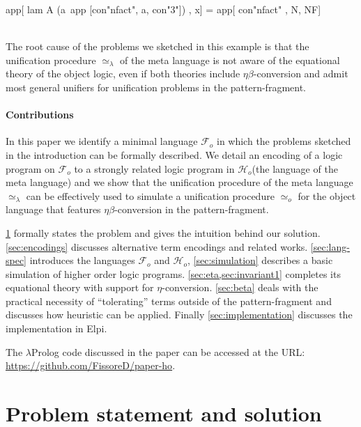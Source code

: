 \documentclass[sigconf,natbib=false,review]{acmart}
\newcommand{\UnifRel}{\ensuremath{\simeq}}
\newcommand{\Uo}{\ensuremath{\UnifRel_o}\xspace}
\newcommand{\Ue}{\ensuremath{\UnifRel_\lambda}\xspace}
\newcommand{\llambda}{\ensuremath{\mathcal{L}_\lambda}\xspace}
\newcommand{\Fo}{\ensuremath{\mathcal{F}_{\!o}\xspace}} %
\newcommand{\Ho}{\ensuremath{\mathcal{H}_o}\xspace}
\begin{document}
\begin{elpicode}
app[ lam A (a\ app [con"nfact", a, con"3"]) , x] =
app[ con"nfact"                             , N, NF]
\end{elpicode}
\noindent
~\\
The root cause of the problems we sketched in this example
is that the unification procedure \Ue of the meta language is not aware
of the equational theory of the object logic, even if both theories
include $\eta\beta$-conversion and admit most general
unifiers for unification problems in the pattern-fragment.

\paragraph{Contributions}
In this paper we identify a minimal language \Fo{} in which the problems
sketched in the introduction can be formally described.
We detail an encoding of a logic program on \Fo{} to a strongly related
logic program in \Ho (the language of the meta language) and we show that
the unification procedure of the meta language \Ue{} can be effectively
used to simulate a unification procedure \Uo for the object language that
features $\eta\beta$-conversion in the pattern-fragment.

\cref{sec:problem-statement} formally states the problem and gives the
intuition behind our solution. \cref{sec:encodings} discusses alternative
term encodings and related works. \cref{sec:lang-spec} introduces
the languages \Fo{} and \Ho{}, \cref{sec:simulation} describes a
basic simulation of higher order logic programs.
\cref{sec:eta,sec:invariant1} completes its equational theory
with support for $\eta$-conversion. \cref{sec:beta} deals with the
practical necessity of ``tolerating'' terms outside of the
pattern-fragment and discusses how heuristic can be applied.
Finally \cref{sec:implementation} discusses the implementation in Elpi.

The $\lambda$Prolog code discussed in the paper can be accessed at the
URL: \url{https://github.com/FissoreD/paper-ho}.

\section{Problem statement and solution} %
\label{sec:problem-statement}

\newcommand{\specunif}[3]{
  #3_i \in \llambda \Rightarrow %
    \exists \rho, %
      \rho #3_1 #1 \rho #3_2  %
        \Leftrightarrow #3_1 #2 #3_2 \mapsto \rho' \subseteq \rho
}
\end{document}
